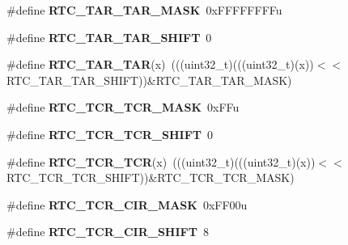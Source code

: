 \begin{DoxyCompactItemize}
\item 
\#define {\bfseries R\+T\+C\+\_\+\+T\+A\+R\+\_\+\+T\+A\+R\+\_\+\+M\+A\+SK}~0x\+F\+F\+F\+F\+F\+F\+F\+Fu\hypertarget{group__RTC__Register__Masks_ga649a76416ad00079054bd866565dada2}{}\label{group__RTC__Register__Masks_ga649a76416ad00079054bd866565dada2}

\item 
\#define {\bfseries R\+T\+C\+\_\+\+T\+A\+R\+\_\+\+T\+A\+R\+\_\+\+S\+H\+I\+FT}~0\hypertarget{group__RTC__Register__Masks_ga9ec8791d91dc36f0f59a7705988f7278}{}\label{group__RTC__Register__Masks_ga9ec8791d91dc36f0f59a7705988f7278}

\item 
\#define {\bfseries R\+T\+C\+\_\+\+T\+A\+R\+\_\+\+T\+AR}(x)~(((uint32\+\_\+t)(((uint32\+\_\+t)(x))$<$$<$R\+T\+C\+\_\+\+T\+A\+R\+\_\+\+T\+A\+R\+\_\+\+S\+H\+I\+FT))\&R\+T\+C\+\_\+\+T\+A\+R\+\_\+\+T\+A\+R\+\_\+\+M\+A\+SK)\hypertarget{group__RTC__Register__Masks_ga02ce5bc2603bebe1356ce961142f6700}{}\label{group__RTC__Register__Masks_ga02ce5bc2603bebe1356ce961142f6700}

\item 
\#define {\bfseries R\+T\+C\+\_\+\+T\+C\+R\+\_\+\+T\+C\+R\+\_\+\+M\+A\+SK}~0x\+F\+Fu\hypertarget{group__RTC__Register__Masks_ga48a96d1de8db1993bfac3ca9d6bdb227}{}\label{group__RTC__Register__Masks_ga48a96d1de8db1993bfac3ca9d6bdb227}

\item 
\#define {\bfseries R\+T\+C\+\_\+\+T\+C\+R\+\_\+\+T\+C\+R\+\_\+\+S\+H\+I\+FT}~0\hypertarget{group__RTC__Register__Masks_ga0d8bc8c79b8010b8ebb94562428713fe}{}\label{group__RTC__Register__Masks_ga0d8bc8c79b8010b8ebb94562428713fe}

\item 
\#define {\bfseries R\+T\+C\+\_\+\+T\+C\+R\+\_\+\+T\+CR}(x)~(((uint32\+\_\+t)(((uint32\+\_\+t)(x))$<$$<$R\+T\+C\+\_\+\+T\+C\+R\+\_\+\+T\+C\+R\+\_\+\+S\+H\+I\+FT))\&R\+T\+C\+\_\+\+T\+C\+R\+\_\+\+T\+C\+R\+\_\+\+M\+A\+SK)\hypertarget{group__RTC__Register__Masks_gaca21d09697f88aef5b056c81daaa8445}{}\label{group__RTC__Register__Masks_gaca21d09697f88aef5b056c81daaa8445}

\item 
\#define {\bfseries R\+T\+C\+\_\+\+T\+C\+R\+\_\+\+C\+I\+R\+\_\+\+M\+A\+SK}~0x\+F\+F00u\hypertarget{group__RTC__Register__Masks_ga8f198d1dbc7427e1dfabdc4e9f53f8e2}{}\label{group__RTC__Register__Masks_ga8f198d1dbc7427e1dfabdc4e9f53f8e2}

\item 
\#define {\bfseries R\+T\+C\+\_\+\+T\+C\+R\+\_\+\+C\+I\+R\+\_\+\+S\+H\+I\+FT}~8\hypertarget{group__RTC__Register__Masks_ga4b8c9ecf8ed798b8c0173ce122874c5e}{}\label{group__RTC__Register__Masks_ga4b8c9ecf8ed798b8c0173ce122874c5e}


\end{DoxyCompactItemize}
